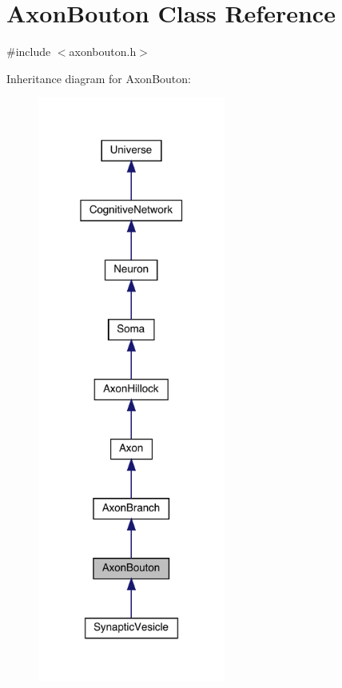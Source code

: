 \hypertarget{class_axon_bouton}{}\section{Axon\+Bouton Class Reference}
\label{class_axon_bouton}


{\ttfamily \#include $<$axonbouton.\+h$>$}



Inheritance diagram for Axon\+Bouton\+:\nopagebreak
\begin{figure}[H]
\begin{center}
\leavevmode
\includegraphics[width=175pt]{class_axon_bouton__inherit__graph}
\end{center}
\end{figure}


